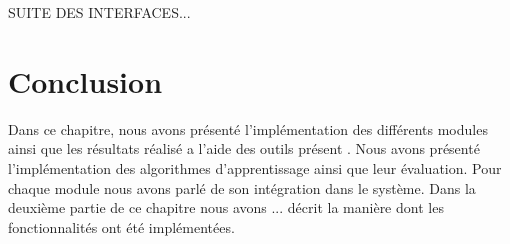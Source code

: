 SUITE DES INTERFACES...


\section{Conclusion}

Dans ce chapitre, nous avons présenté l'implémentation des différents modules ainsi que les résultats réalisé a l'aide des outils présent . Nous avons présenté l'implémentation des algorithmes d'apprentissage ainsi que leur évaluation. Pour chaque module nous avons parlé de son intégration dans le système. Dans la deuxième partie de ce chapitre nous avons ... décrit la manière dont les
fonctionnalités ont été implémentées. 